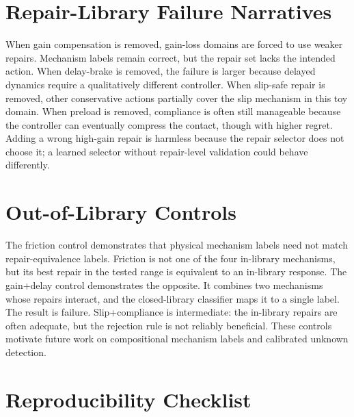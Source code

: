 \documentclass{article}
\begin{document}
\section{Repair-Library Failure Narratives}

When gain compensation is removed, gain-loss domains are forced to use weaker
repairs. Mechanism labels remain correct, but the repair set lacks the intended
action. When delay-brake is removed, the failure is larger because delayed
dynamics require a qualitatively different controller. When slip-safe repair is
removed, other conservative actions partially cover the slip mechanism in this
toy domain. When preload is removed, compliance is often still manageable
because the controller can eventually compress the contact, though with higher
regret. Adding a wrong high-gain repair is harmless because the repair selector
does not choose it; a learned selector without repair-level validation could
behave differently.

\section{Out-of-Library Controls}

The friction control demonstrates that physical mechanism labels need not match
repair-equivalence labels. Friction is not one of the four in-library mechanisms,
but its best repair in the tested range is equivalent to an in-library response.
The gain+delay control demonstrates the opposite. It combines two mechanisms
whose repairs interact, and the closed-library classifier maps it to a single
label. The result is failure. Slip+compliance is intermediate: the in-library
repairs are often adequate, but the rejection rule is not reliably beneficial.
These controls motivate future work on compositional mechanism labels and
calibrated unknown detection.

\section{Reproducibility Checklist}
\end{document}
